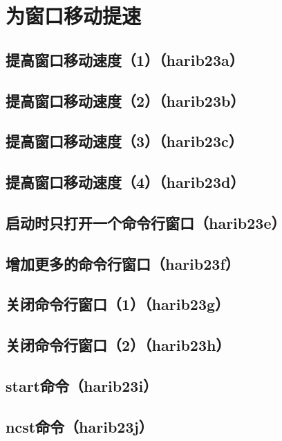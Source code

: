 ﻿\chapter{	为窗口移动提速	}
\section{	提高窗口移动速度（1）（harib23a）	}
\section{	提高窗口移动速度（2）（harib23b）	}
\section{	提高窗口移动速度（3）（harib23c）	}
\section{	提高窗口移动速度（4）（harib23d）	}
\section{	启动时只打开一个命令行窗口（harib23e）	}
\section{	增加更多的命令行窗口（harib23f）	}
\section{	关闭命令行窗口（1）（harib23g）	}
\section{	关闭命令行窗口（2）（harib23h）	}
\section{	start命令（harib23i）	}
\section{	ncst命令（harib23j）	}


